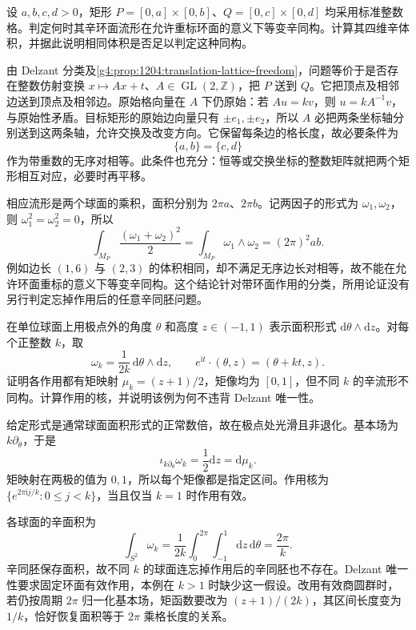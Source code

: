 \begin{exercise}\label{g4:ex:12:rectangle-rigidity}
	设 \(a,b,c,d>0\)，矩形 \(P=[0,a]\times[0,b]\)、\(Q=[0,c]\times[0,d]\) 均采用标准整数格。判定何时其辛环面流形在允许重标环面的意义下等变辛同构。计算其四维辛体积，并据此说明相同体积是否足以判定这种同构。
\end{exercise}
\begin{solution}
	由 Delzant 分类及\cref{g4:prop:1204:translation-lattice-freedom}，问题等价于是否存在整数仿射变换 \(x\mapsto Ax+t\)、\(A\in\operatorname{GL}(2,\mathbb Z)\)，把 \(P\) 送到 \(Q\)。它把顶点及相邻边送到顶点及相邻边。原始格向量在 \(A\) 下仍原始：若 \(Au=kv\)，则 \(u=kA^{-1}v\)，与原始性矛盾。目标矩形的原始边向量只有 \(\pm e_1,\pm e_2\)，所以 \(A\) 必把两条坐标轴分别送到这两条轴，允许交换及改变方向。它保留每条边的格长度，故必要条件为
	\[
		\{a,b\}=\{c,d\}
	\]
	作为带重数的无序对相等。此条件也充分：恒等或交换坐标的整数矩阵就把两个矩形相互对应，必要时再平移。

	相应流形是两个球面的乘积，面积分别为 \(2\pi a\)、\(2\pi b\)。记两因子的形式为 \(\omega_1,\omega_2\)，则 \(\omega_1^2=\omega_2^2=0\)，所以
	\[
		\int_{M_P}\frac{(\omega_1+\omega_2)^2}{2}
		=\int_{M_P}\omega_1\wedge\omega_2=(2\pi)^2ab.
	\]
	例如边长 \((1,6)\) 与 \((2,3)\) 的体积相同，却不满足无序边长对相等，故不能在允许环面重标的意义下等变辛同构。这个结论针对带环面作用的分类，所用论证没有另行判定忘掉作用后的任意辛同胚问题。
\end{solution}

\begin{exercise}\label{g4:ex:12:ineffective-same-image}
	在单位球面上用极点外的角度 \(\theta\) 和高度 \(z\in(-1,1)\) 表示面积形式 \(\mathrm{d}\theta\wedge\mathrm{d}z\)。对每个正整数 \(k\)，取
	\[
		\omega_k=\frac1{2k}\,\mathrm{d}\theta\wedge\mathrm{d}z,
		\qquad e^{\mathrm{i}t}\cdot(\theta,z)=(\theta+kt,z).
	\]
	证明各作用都有矩映射 \(\mu_k=(z+1)/2\)，矩像均为 \([0,1]\)，但不同 \(k\) 的辛流形不同构。计算作用的核，并说明该例为何不违背 Delzant 唯一性。
\end{exercise}
\begin{solution}
	给定形式是通常球面面积形式的正常数倍，故在极点处光滑且非退化。基本场为 \(k\partial_\theta\)，于是
	\[
		\iota_{k\partial_\theta}\omega_k=\frac12\mathrm{d}z
		=\mathrm{d}\mu_k.
	\]
	矩映射在两极的值为 \(0,1\)，所以每个矩像都是指定区间。作用核为 \(\{e^{2\pi\mathrm{i}j/k}:0\le j<k\}\)，当且仅当 \(k=1\) 时作用有效。

	各球面的辛面积为
	\[
		\int_{S^2}\omega_k
		=\frac1{2k}\int_0^{2\pi}\int_{-1}^1\mathrm{d}z\,\mathrm{d}\theta
		=\frac{2\pi}{k}.
	\]
	辛同胚保存面积，故不同 \(k\) 的球面连忘掉作用后的辛同胚也不存在。Delzant 唯一性要求固定环面有效作用，本例在 \(k>1\) 时缺少这一假设。改用有效商圆群时，若仍按周期 \(2\pi\) 归一化基本场，矩函数要改为 \((z+1)/(2k)\)，其区间长度变为 \(1/k\)，恰好恢复面积等于 \(2\pi\) 乘格长度的关系。
\end{solution}

